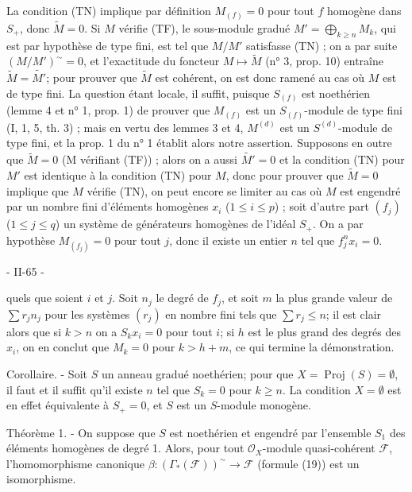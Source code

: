 La condition (TN) implique par définition $M_{(f)} = 0$ pour tout $f$ homogène dans $S_+$, donc $\widetilde{M} = 0$. Si $M$ vérifie (TF), le sous-module gradué $M' = \bigoplus_{k \ge n} M_k$, qui est par hypothèse de type fini, est tel que $M/M'$ satisfasse (TN) ; on a par suite $(M/M')^{\sim} = 0$, et l'exactitude du foncteur $M \mapsto \widetilde{M}$ (n° 3, prop. 10) entraîne $\widetilde{M} = \widetilde{M'}$; pour prouver que $\widetilde{M}$ est cohérent, on est donc ramené au cas où $M$ est de type fini. La question étant locale, il suffit, puisque $S_{(f)}$ est noethérien (lemme 4 et n° 1, prop. 1) de prouver que $M_{(f)}$ est un $S_{(f)}$-module de type fini (I, 1, 5, th. 3) ; mais en vertu des lemmes 3 et 4, $M^{(d)}$ est un $S^{(d)}$-module de type fini, et la prop. 1 du n° 1 établit alors notre assertion. Supposons en outre que $\widetilde{M} = 0$ (M vérifiant (TF)) ; alors on a aussi $\widetilde{M'} = 0$ et la condition (TN) pour $M'$ est identique à la condition (TN) pour $M$, donc pour prouver que $\widetilde{M} = 0$ implique que $M$ vérifie (TN), on peut encore se limiter au cas où $M$ est engendré par un nombre fini d'éléments homogènes $x_i$ ($1 \le i \le p$) ; soit d'autre part $(f_j)$ ($1 \le j \le q$) un système de générateurs homogènes de l'idéal $S_+$. On a par hypothèse $M_{(f_j)} = 0$ pour tout $j$, donc il existe un entier $n$ tel que $f_j^n x_i = 0$.

\newpage


- II-65 -

quels que soient $i$ et $j$. Soit $n_j$ le degré de $f_j$, et soit $m$ la plus grande valeur de $\sum r_j n_j$ pour les systèmes $(r_j)$ en nombre fini tels que $\sum r_j \le n$; il est clair alors que si $k > n$ on a $S_k x_i = 0$ pour tout $i$; si $h$ est le plus grand des degrés des $x_i$, on en conclut que $M_k = 0$ pour $k > h + m$, ce qui termine la démonstration.

Corollaire. - Soit $S$ un anneau gradué noethérien; pour que $X = \operatorname{Proj}(S) = \emptyset$, il faut et il suffit qu'il existe $n$ tel que $S_k = 0$ pour $k \ge n$. La condition $X = \emptyset$ est en effet équivalente à $S_+ = 0$, et $S$ est un $S$-module monogène.

Théorème 1. - On suppose que $S$ est noethérien et engendré par l'ensemble $S_1$ des éléments homogènes de degré 1. Alors, pour tout $\mathcal{O}_X$-module quasi-cohérent $\mathcal{F}$, l'homomorphisme canonique $\beta : (\Gamma_*(\mathcal{F}))^{\sim} \to \mathcal{F}$ (formule (19)) est un isomorphisme.

